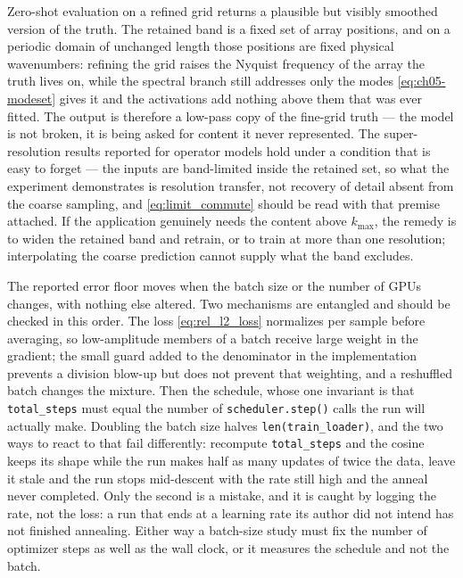 Zero-shot evaluation on a refined grid returns a plausible but visibly smoothed version of the
truth. The retained band is a fixed set of array positions, and on a periodic domain of
unchanged length those positions are fixed physical wavenumbers: refining the grid raises the
Nyquist frequency of the array the truth lives on, while the spectral branch still addresses
only the modes \eqref{eq:ch05-modeset} gives it and the activations add nothing above them
that was ever fitted. The output is
therefore a low-pass copy of the fine-grid truth --- the model is not broken, it is being
asked for content it never represented. The
super-resolution results reported for operator models hold under a condition that is easy to
forget --- the inputs are band-limited inside the retained set, so what the experiment
demonstrates is resolution transfer, not recovery of detail absent from the coarse sampling,
and \eqref{eq:limit_commute} should be read with that premise attached. If the application
genuinely needs the content above $k_{\max}$, the remedy is to widen the retained band and
retrain, or to train at more than one resolution; interpolating the coarse prediction cannot
supply what the band excludes.

The reported error floor moves when the batch size or the number of GPUs changes, with
nothing else altered. Two mechanisms are entangled and should be checked in this order. The
loss \eqref{eq:rel_l2_loss} normalizes per sample before averaging, so low-amplitude members
of a batch receive large weight in the gradient; the small guard added to the denominator in
the implementation prevents a division blow-up but does not prevent that weighting, and a
reshuffled batch changes the mixture. Then the schedule, whose one invariant is that
\texttt{total\_steps} must equal the number of \texttt{scheduler.step()} calls the run will
actually make. Doubling the batch size halves \texttt{len(train\_loader)}, and the two ways to
react to that fail differently: recompute \texttt{total\_steps} and the cosine keeps its shape
while the run makes half as many updates of twice the data, leave it stale and the run stops
mid-descent with the rate still high and the anneal never completed. Only the second is a
mistake, and it is caught by logging the rate, not the loss: a run that ends at a learning
rate its author did not intend has not finished annealing. Either way a batch-size study must
fix the number of optimizer steps as well as the wall clock, or it measures the schedule and
not the batch.

